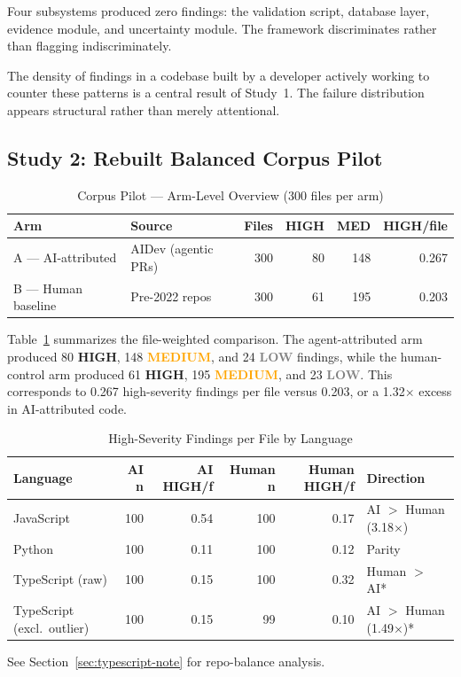 \documentclass[11pt]{article}
\newcommand{\HIGH}{\textcolor{aira-red}{\textbf{HIGH}}}
\newcommand{\MED}{\textcolor{orange}{\textbf{MEDIUM}}}
\newcommand{\LOW}{\textcolor{gray}{\textbf{LOW}}}
\begin{document}
Four subsystems produced zero findings: the validation script, database layer, evidence
module, and uncertainty module. The framework discriminates rather than flagging
indiscriminately.

The density of findings in a codebase built by a developer actively working to counter
these patterns is a central result of Study~1. The failure distribution appears structural
rather than merely attentional.

\subsection{Study 2: Rebuilt Balanced Corpus Pilot}
\label{sec:study2}

\begin{table}[htbp]
\centering
\caption{Corpus Pilot --- Arm-Level Overview (300 files per arm)}
\label{tab:corpus-arm}
\small
\begin{tabular}{@{}llrrrr@{}}
\toprule
\textbf{Arm} & \textbf{Source} & \textbf{Files} & \textbf{HIGH} & \textbf{MED} &
\textbf{HIGH/file} \\
\midrule
A --- AI-attributed & AIDev (agentic PRs) & 300 & 80 & 148 & 0.267 \\
B --- Human baseline & Pre-2022 repos & 300 & 61 & 195 & 0.203 \\
\bottomrule
\end{tabular}
\end{table}

Table~\ref{tab:corpus-arm} summarizes the file-weighted comparison. The agent-attributed
arm produced 80 \HIGH{}, 148 \MED{}, and 24 \LOW{} findings, while the human-control arm
produced 61 \HIGH{}, 195 \MED{}, and 23 \LOW{}. This corresponds to 0.267 high-severity
findings per file versus 0.203, or a 1.32$\times$ excess in AI-attributed code.

\begin{table}[htbp]
\centering
\caption{High-Severity Findings per File by Language}
\label{tab:corpus-lang}
\footnotesize
\begin{tabularx}{\textwidth}{@{}>{\raggedright\arraybackslash}p{2.5cm}rrrr>{\raggedright\arraybackslash}X@{}}
\toprule
\textbf{Language} & \textbf{AI n} & \textbf{AI HIGH/f} &
\textbf{Human n} & \textbf{Human HIGH/f} & \textbf{Direction} \\
\midrule
JavaScript & 100 & 0.54 & 100 & 0.17 & AI $>$ Human (3.18$\times$) \\
Python & 100 & 0.11 & 100 & 0.12 & Parity \\
TypeScript (raw) & 100 & 0.15 & 100 & 0.32 & Human $>$ AI* \\
TypeScript (excl.\ outlier) & 100 & 0.15 & 99 & 0.10 & AI $>$ Human (1.49$\times$)* \\
\bottomrule
\end{tabularx}
\vspace{0.25em}
\parbox{\textwidth}{\footnotesize * See Section~\ref{sec:typescript-note} for repo-balance analysis.}
\end{table}
\end{document}
